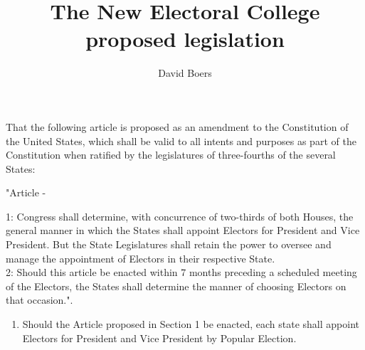 \documentclass{article}
\title{The New Electoral College proposed legislation}
\author{David Boers}
\begin{document}
    \subject{To propose an Amendment to the Constitution of the United States to modify the Electoral College and for other purposes.}
    That the following article is proposed as an amendment to the Constitution of the United States, which shall be valid to all intents and purposes as part of the Constitution when ratified by the legislatures of three-fourths of the several States:\\
    \begin{center}"Article -\end{center}
    1: Congress shall determine, with concurrence of two-thirds of both Houses, the general manner in which the States shall 
        appoint Electors for President and Vice President. But the State Legislatures shall retain the power to oversee and manage the appointment of 
        Electors in their respective State.\\
    2: Should this article be enacted within 7 months preceding a scheduled meeting of the Electors, the States shall determine the manner of choosing 
        Electors on that occasion.".\\
    \begin{enumerate}
        \item Should the Article proposed in Section 1 be enacted, each state shall appoint Electors for President and Vice President by Popular Election.
    \end{enumerate}
\end{document}
